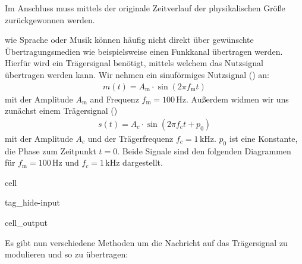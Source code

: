 \documentclass[letterpaper,10pt,english]{jupyterBook}
\begin{document}
\sphinxAtStartPar
Im Anschluss muss mittels  der originale Zeitverlauf der physikalischen Größe zurückgewonnen werden.

\sphinxAtStartPar
{} wie Sprache oder Musik können häufig nicht direkt über gewünschte Übertragungsmedien wie beispielsweise einen Funkkanal übertragen werden. Hierfür wird ein Trägersignal benötigt, mittels welchem das Nutzsignal übertragen werden kann.
Wir nehmen ein sinuförmiges Nutzsignal () an:
\begin{equation*}
\begin{split}m(t) = A_\mathrm{m} \cdot \sin(2\pi f_\mathrm{m} t)\end{split}
\end{equation*}
\sphinxAtStartPar
mit der Amplitude \(A_\mathrm{m}\) and Frequenz \(f_\mathrm{m} = 100\,\mathrm{Hz}\). Außerdem widmen wir uns zunächst einem  Trägersignal ()
\begin{equation*}
\begin{split}s(t) = A_c \cdot \sin(2\pi f_c t + p_0)\end{split}
\end{equation*}
\sphinxAtStartPar
mit der Amplitude \(A_c\) und der Trägerfrequenz \(f_c = 1\,\mathrm{kHz}\). \(p_{0}\) ist eine Konstante, die Phase zum Zeitpunkt \(t=0\).
Beide Signale sind den folgenden Diagrammen für \(f_\mathrm{m} = 100\,\mathrm{Hz}\) und \(f_c = 1\,\mathrm{kHz}\) dargestellt.

\begin{sphinxuseclass}{cell}
\begin{sphinxuseclass}{tag_hide-input}\begin{sphinxVerbatimOutput}

\begin{sphinxuseclass}{cell_output}
\noindent{}

\end{sphinxuseclass}\end{sphinxVerbatimOutput}

\end{sphinxuseclass}
\end{sphinxuseclass}
\sphinxAtStartPar
Es gibt nun verschiedene Methoden um die Nachricht auf das Trägersignal zu modulieren und so zu übertragen:
\end{document}
